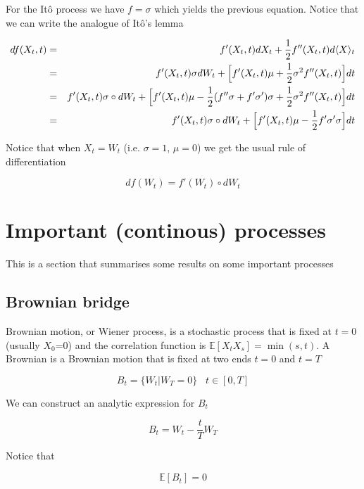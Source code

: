 \documentclass[11pt,a4paper]{article}
\begin{document}
For the It\^{o} process we have $f = \sigma$ which yields the previous equation. Notice that we can write the analogue of It\^{o}'s lemma


\begin{eqnarray*}
    df(X_t,t) &=& f'(X_t,t)dX_t + \frac{1}{2}f''(X_t,t)d\langle X\rangle_t\\
    &=& f'(X_t,t)\sigma dW_t+\Bigl[f'(X_t,t)\mu +\frac{1}{2}\sigma^2f''(X_t,t)\Bigl]dt \\
    &=& f'(X_t,t)\sigma \circ dW_t + \Bigl[f'(X_t,t)\mu -\frac{1}{2}(f''\sigma+f'\sigma')\sigma+\frac{1}{2}\sigma^2f''(X_t,t)\Bigl]dt  \\
    &=& f'(X_t,t)\sigma \circ dW_t + \Bigl[f'(X_t,t)\mu -\frac{1}{2}f'\sigma'\sigma\Bigl]dt
\end{eqnarray*}

Notice that when $X_t = W_t$ (i.e. $\sigma = 1$, $\mu = 0$) we get the usual rule of differentiation

\begin{equation}
    df(W_t) = f'(W_t)\circ dW_t
\end{equation}


\section{Important (continous) processes}
This is a section that summarises some results on some important processes

\subsection{Brownian bridge}

Brownian motion, or Wiener process, is a stochastic process that is fixed at $t=0$ (usually $X_0$=0) and the correlation function is $\mathbb{E}[X_tX_s] = \min(s,t)$. A Brownian is a Brownian motion that is fixed at two ends $t=0$ and $t=T$

\begin{equation}
    B_t = \{W_t |W_T = 0\} \hspace{10pt} t\in [0,T]
\end{equation}

We can construct an analytic expression for $B_t$

\begin{equation}
    B_t = W_t - \frac{t}{T}W_{T}
\end{equation}

Notice that

\begin{equation}
    \mathbb{E}[B_t] = 0
\end{equation}
\end{document}
